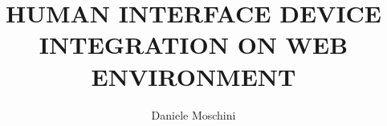 \documentclass{unicam_thesis}
\title{HUMAN INTERFACE DEVICE INTEGRATION ON WEB ENVIRONMENT}
\author{Daniele Moschini}%
\theoremstyle{definition} \newtheorem{esempio}{Esempio}[chapter]
\theoremstyle{definition}
\begin{document}
\maketitle

\tableofcontents
\lstlistoflistings
\listoffigures






\appendix
%
%
%

\printbibliography

\printindex


\end{document}
